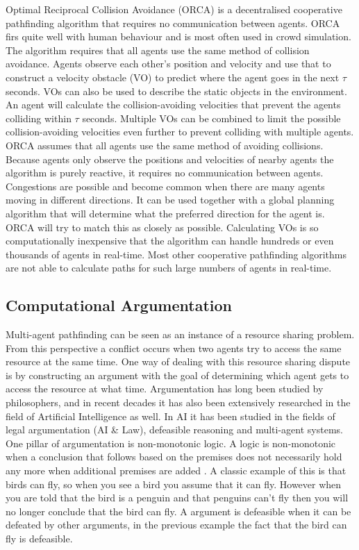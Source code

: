 Optimal Reciprocal Collision Avoidance (ORCA) \cite{vandenberg2011} is a
decentralised cooperative pathfinding algorithm that requires no communication
between agents. ORCA firs quite well with human behaviour and is most often 
used in crowd simulation. The algorithm requires that all agents use the same 
method of
collision avoidance. Agents observe each other's position and velocity and use
that to construct a velocity obstacle (VO) to predict where the agent goes in
the next $\tau$ seconds. VOs can also be used to describe the static objects in
the environment. An agent will calculate the collision-avoiding velocities that
prevent the agents colliding within $\tau$ seconds. Multiple VOs can be
combined to limit the possible collision-avoiding velocities even further to 
prevent
colliding with multiple agents. ORCA assumes that all agents use the same
method of avoiding collisions. Because agents only observe the positions and
velocities of nearby agents the algorithm is purely reactive, it requires no 
communication between agents. Congestions are
possible and become common when there are many agents moving in different
directions. It can be used together with a global planning algorithm that will
determine what the preferred direction for the agent is. ORCA will try to
match this as closely as possible. Calculating VOs is so computationally
inexpensive that the algorithm can handle hundreds or even thousands of agents
in real-time. Most other cooperative pathfinding algorithms are not able to 
calculate
paths for such large numbers of agents in real-time.

\subsection{Computational Argumentation}
Multi-agent pathfinding can be seen as an instance of a resource sharing
problem. From this perspective a conflict occurs when two agents try to access
the same resource at the same time. One way of dealing with this resource
sharing dispute is by constructing an argument with the goal of determining
which agent gets to access the resource at what time. Argumentation has long
been studied by philosophers, and in recent decades it has also been
extensively researched in
the field of Artificial Intelligence as well. In AI it has been studied
in the fields of legal argumentation (AI \& Law), defeasible reasoning and
multi-agent systems. One pillar of argumentation is non-monotonic logic. A 
logic is
non-monotonic when a conclusion that follows based on the premises does not
necessarily hold any more when additional premises are added
\cite{vaneemeren2014,modgil2013,rahwan2009}. A classic example of this is that 
birds can
fly, so when
you see a bird you assume that it can fly. However when you are told that the
bird is a penguin and that penguins can't fly then you will no longer conclude
that the bird can fly. A argument is defeasible when it can be defeated by
other arguments, in the previous example the fact that the bird can fly is 
defeasible.

